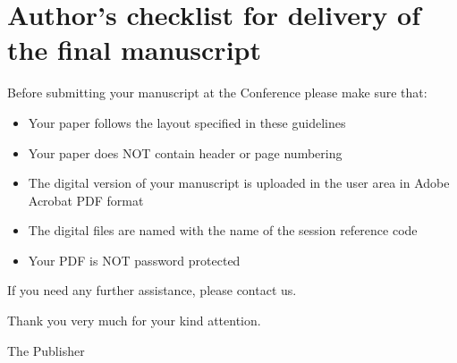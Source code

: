 \documentclass{eupvsec}
\begin{document}
\section{Author's checklist for delivery of the final manuscript}

Before submitting your manuscript at the Conference please make sure
that:

\begin{itemize}
  \item Your paper follows the layout specified in these guidelines
  \item Your paper does NOT contain header or page numbering
  \item The digital version of your manuscript is uploaded in the
        user area in Adobe Acrobat PDF format
  \item The digital files are named with the name of the session
        reference code
  \item Your PDF is NOT password protected
\end{itemize}

If you need any further assistance, please contact us.

Thank you very much for your kind attention.

The Publisher



\end{document}
